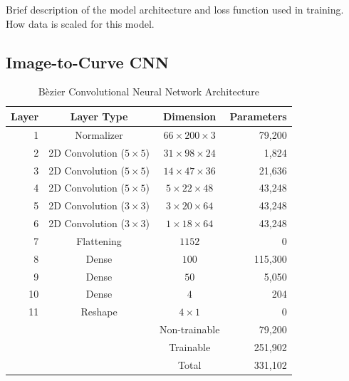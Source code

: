 \documentclass[conference]{IEEEtran}
\begin{document}
Brief description of the model architecture and loss function used in training.
How data is scaled for this model.

\subsection{Image-to-Curve CNN}

\begin{table}[htbp]
	\centering
	\caption{B\`ezier Convolutional Neural Network Architecture}
	\begin{tabular}{|r|c|c|r|}
	\multicolumn{1}{c}{\bfseries Layer} & \multicolumn{1}{c}{\bfseries Layer Type} & \multicolumn{1}{c}{\bfseries Dimension} & \multicolumn{1}{c}{\bfseries Parameters} \\ \hline
	1 & Normalizer & $66 \times 200 \times 3$ & 79,200 \\
	2 & 2D Convolution ($5\times5$)& $31 \times 98 \times 24$ & 1,824 \\
	3 & 2D Convolution ($5\times5$)& $14 \times 47 \times 36$ & 21,636 \\
	4 & 2D Convolution ($5\times5$)& $5 \times 22 \times 48$ & 43,248 \\
	5 & 2D Convolution ($3\times3$)& $3 \times 20 \times 64$ & 43,248 \\
	6 & 2D Convolution ($3\times3$)& $1 \times 18 \times 64$ & 43,248 \\
	7 & Flattening & $1152$ & 0 \\
	8 & Dense & $100$ & 115,300 \\
	9 & Dense & $50$ & 5,050 \\
	10 & Dense & $4$ & 204 \\
	11 & Reshape & $4\times 1$ & 0 \\ \hline
	\multicolumn{2}{c|}{} & Non-trainable & 79,200 \\
	\multicolumn{2}{c|}{} & Trainable & 251,902 \\ \cline{3-4}
	\multicolumn{2}{c|}{} & Total & 331,102 \\ \cline{3-4}
	\end{tabular}
\end{table}
\end{document}
